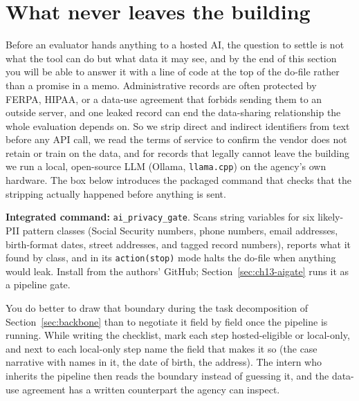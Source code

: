\documentclass[
    a4paper,
    fontsize=10pt,
    twoside=true,
    numbers=noenddot,
]{kaobook}
\begin{document}
\section{What never leaves the building}
Before an evaluator hands anything to a hosted AI, the question to settle is not what the tool can do but what data it may see, and by the end of this section you will be able to answer it with a line of code at the top of the do-file rather than a promise in a memo. Administrative records are often protected by FERPA, HIPAA, or a data-use agreement that forbids sending them to an outside server, and one leaked record can end the data-sharing relationship the whole evaluation depends on. So we strip direct and indirect identifiers from text before any API call, we read the terms of service to confirm the vendor does not retain or train on the data, and for records that legally cannot leave the building we run a local, open-source LLM (Ollama, \texttt{llama.cpp}) on the agency's own hardware. The box below introduces the packaged command that checks that the stripping actually happened before anything is sent.

\begin{kaobox}[frametitle=Package Integration: \texttt{ai\_privacy\_gate}]
\textbf{Integrated command:} \texttt{ai\_privacy\_gate}. Scans string variables for six likely-PII pattern classes (Social Security numbers, phone numbers, email addresses, birth-format dates, street addresses, and tagged record numbers), reports what it found by class, and in its \texttt{action(stop)} mode halts the do-file when anything would leak. Install from the authors' GitHub; Section~\ref{sec:ch13-aigate} runs it as a pipeline gate.
\end{kaobox}

You do better to draw that boundary during the task decomposition of Section~\ref{sec:backbone} than to negotiate it field by field once the pipeline is running. While writing the checklist, mark each step hosted-eligible or local-only, and next to each local-only step name the field that makes it so (the case narrative with names in it, the date of birth, the address). The intern who inherits the pipeline then reads the boundary instead of guessing it, and the data-use agreement has a written counterpart the agency can inspect.
\end{document}
